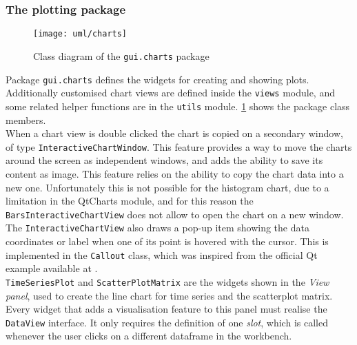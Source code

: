 \subsubsection{The plotting package}
\begin{figure}
	\centering
	\texttt{[image: uml/charts]}
	\caption{Class diagram of the \texttt{gui.charts} package}
	\label{fig:chartsuml}
\end{figure}
Package \texttt{gui.charts} defines the widgets for creating and showing plots. Additionally customised chart views are defined inside the \texttt{views} module, and some related helper functions are in the \texttt{utils} module. \cref{fig:chartsuml} shows the package class members.\\
When a chart view is double clicked the chart is copied on a secondary window, of type \texttt{InteractiveChartWindow}. This feature provides a way to move the charts around the screen as independent windows, and adds the ability to save its content as image. This feature relies on the ability to copy the chart data into a new one. Unfortunately this is not possible for the histogram chart, due to a limitation in the QtCharts module, and for this reason the \texttt{BarsInteractiveChartView} does not allow to open the chart on a new window. The \texttt{InteractiveChartView} also draws a pop-up item showing the data coordinates or label when one of its point is hovered with the cursor. This is implemented in the \texttt{Callout} class, which was inspired from the official Qt example available at \cite{site:qt-example-callout}.\\
\texttt{TimeSeriesPlot} and \texttt{ScatterPlotMatrix} are the widgets shown in the \textit{View panel}, used to create the line chart for time series and the scatterplot matrix. Every widget that adds a visualisation feature to this panel must realise the \texttt{DataView} interface. It only requires the definition of one \textit{slot},  which is called whenever the user clicks on a different dataframe in the workbench.

